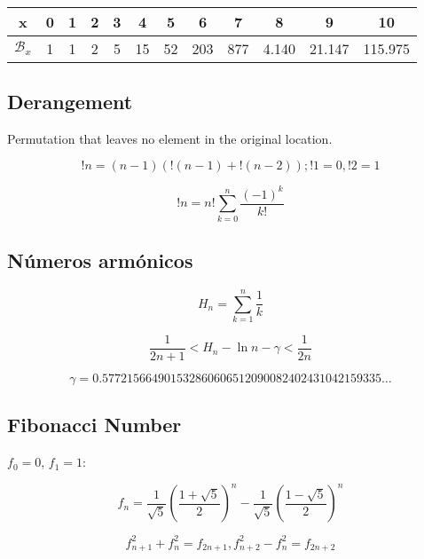 \documentclass[a4paper]{amsart}
\begin{document}
\

\begin{tabular}{|c|c|c|c|c|c|c|c|c|c|c|c|}
    \hline
    x&0&1&2&3&4&5&6&7&8&9&10 \\ \hline %
    $\mathcal{B}_x$&1&1&2&5&15&52&203&877&4.140&21.147&115.975 \\ \hline %
\end{tabular}

\subsection{Derangement} Permutation that leaves no element in the original location.

\begin{equation*}
    !n = (n - 1)( !(n - 1) + !(n - 2) ); !1 = 0, !2 = 1
\end{equation*}

\begin{equation*}
    !n = n! \sum_{k = 0}^n \frac{(-1)^k}{k!}
\end{equation*}

\subsection{Números armónicos}

\begin{equation*}
    H_n = \sum_{k = 1}^n \frac{1}{k}
\end{equation*}

\begin{equation*}
    \frac{1}{2n+1} < H_n - \ln n - \gamma < \frac{1}{2n}
\end{equation*}

\begin{equation*}
    \gamma = 0.57721 56649 01532 86060 65120 90082 40243 10421 59335 \ldots
\end{equation*}

\subsection{Fibonacci Number} $f_0 = 0$, $f_1 = 1$:

\begin{equation*}
    f_n = \frac{1}{\sqrt{5}}(\frac{1 + \sqrt{5}}{2})^n - \frac{1}{\sqrt{5}}(\frac{1 - \sqrt{5}}{2})^n
\end{equation*}

\begin{equation*}
    f_{n+1}^2 + f_n^2 = f_{2n + 1}, 
    f_{n+2}^2 - f_n^2 = f_{2n + 2}
\end{equation*}
\end{document}
